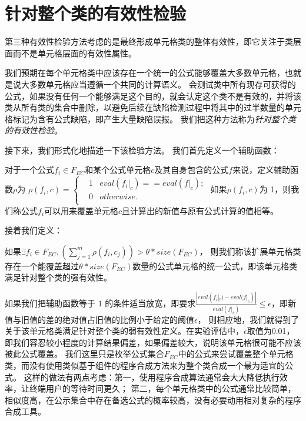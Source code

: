 \section{针对整个类的有效性检验}
第三种有效性检验方法考虑的是最终形成单元格类的整体有效性，即它关注于类层面而不是单元格层面的有效性属性。

我们预期在每个单元格类中应该存在一个统一的公式能够覆盖大多数单元格，也就是说大多数单元格应当遵循一个共同的计算语义。
\wa 会测试类中所有现存可获得的公式，如果没有任何一个能够满足这个目的，\wa 就会认定这个类不是有效的，并将该类从所有类的集合中删除，以避免后续在缺陷检测过程中将其中的过半数量的单元格标记为含有公式缺陷，即产生大量缺陷误报。
我们把这种方法称为\textit{针对整个类的有效性检验}。

接下来，我们形式化地描述一下该检验方法。
我们首先定义一个辅助函数：
\begin{definition}
    对于一个公式$f_i \in F_{EC}$和某个公式单元格$c$及其自身包含的公式$f$来说，定义辅助函数$\rho$为
    $
    \rho(f_i, c) = 
    \left\{
        \begin{aligned}
        & 1     & eval(f_i|_c) == eval(f|_c); \\
        & 0     & otherwise. \\
        \end{aligned}
    \right.
    $
    如果$\rho(f_i,c)$为 1，则我们称公式$f_i$可以用来覆盖单元格$c$且计算出的新值与原有公式计算的值相等。
\end{definition}

接着我们定义：
\begin{definition}
    如果$\exists f_i \in F_{EC}, (\sum_{j = 1}^{m} \rho(f_i, c_j)) > \theta  * size(F_{EC})$，
    则我们称该扩展单元格类存在一个能覆盖超过$\theta  * size(F_{EC})$数量的公式单元格的统一公式，即该单元格类满足针对整个类的强有效性。
\end{definition}

如果我们把辅助函数等于 $1$ 的条件适当放宽，即要求$\frac{|eval(f_i|_c)-eval(f|_c)|}{eval(f|_c)} \leq \epsilon$，即新值与旧值的差的绝对值占旧值的比例小于给定的阈值$\epsilon$，
则相应地，我们就得到了关于该单元格类满足针对整个类的弱有效性定义。在实验评估中，$\epsilon$取值为0.01，即我们容忍较小程度的计算结果偏差，如果偏差较大，说明该单元格很可能不应该被此公式覆盖。
我们这里只是枚举公式集合$F_{EC}$中的公式来尝试覆盖整个单元格类，而没有使用类似基于组件的程序合成方法来为整个类合成一个最为适宜的公式。
这样的做法有两点考虑：第一，使用程序合成算法通常会大大降低执行效率，让终端用户的等待时间更久；
第二，每个单元格类中的公式通常比较简单，相似度高，在公示集合中存在备选公式的概率较高，没有必要动用相对复杂的程序合成工具。

